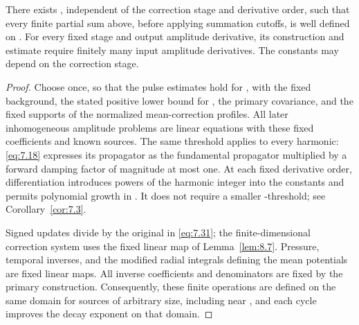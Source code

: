 \begin{lemma}\label{lem:9.7}
There exists , independent of the correction stage and
derivative order, such that every finite partial sum above, before applying summation cutoffs, is well
defined on . For every fixed stage and output amplitude
derivative, its construction and estimate require finitely many input amplitude derivatives. The
constants may depend on the correction stage.
\end{lemma}

\begin{proof}
Choose  once, so that the pulse estimates hold for
, with the fixed background, the stated positive lower
bound for , the primary covariance, and the fixed supports of the
normalized mean-correction profiles. All later inhomogeneous amplitude problems are linear equations
with these fixed coefficients and known sources. The same threshold applies to every harmonic:
\eqref{eq:7.18} expresses its propagator as the fundamental propagator multiplied by a forward
damping factor of magnitude at most one. At each
%
fixed derivative order, differentiation introduces powers of the harmonic integer into the constants
and permits polynomial growth in . It does not require a smaller
-threshold; see Corollary~\ref{cor:7.3}.

Signed updates divide by the original  in
\eqref{eq:7.31}; the finite-dimensional correction system uses the fixed linear map of
Lemma~\ref{lem:8.7}. Pressure, temporal inverses, and the modified radial integrals defining the
mean potentials are fixed linear maps. All inverse coefficients and denominators are fixed by the
primary construction. Consequently, these finite operations are defined on the same domain for
sources of arbitrary size, including near , and each cycle
improves the decay exponent on that domain.


\end{proof}
